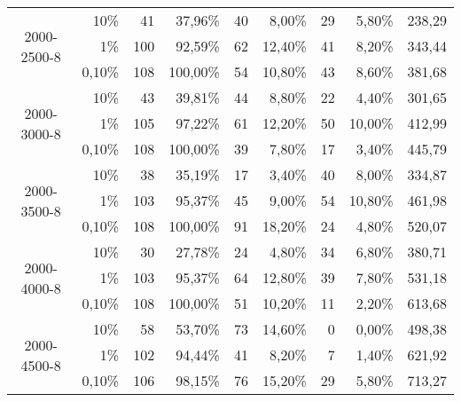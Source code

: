 \begin{sidewaystable}[htbp]
\begin{tabular}{rrrrrrrrr}
    \multicolumn{1}{c}{\multirow{3}[0]{*}{2000-2500-8}} & 10\%  & 41    & 37,96\% & 40    & 8,00\% & 29    & 5,80\% & 238,29 \\
    \multicolumn{1}{c}{} & 1\%   & 100   & 92,59\% & 62    & 12,40\% & 41    & 8,20\% & 343,44 \\
    \multicolumn{1}{c}{} & 0,10\% & 108   & 100,00\% & 54    & 10,80\% & 43    & 8,60\% & 381,68 \\
    \multicolumn{1}{c}{\multirow{3}[0]{*}{2000-3000-8}} & 10\%  & 43    & 39,81\% & 44    & 8,80\% & 22    & 4,40\% & 301,65 \\
    \multicolumn{1}{c}{} & 1\%   & 105   & 97,22\% & 61    & 12,20\% & 50    & 10,00\% & 412,99 \\
    \multicolumn{1}{c}{} & 0,10\% & 108   & 100,00\% & 39    & 7,80\% & 17    & 3,40\% & 445,79 \\
    \multicolumn{1}{c}{\multirow{3}[0]{*}{2000-3500-8}} & 10\%  & 38    & 35,19\% & 17    & 3,40\% & 40    & 8,00\% & 334,87 \\
    \multicolumn{1}{c}{} & 1\%   & 103   & 95,37\% & 45    & 9,00\% & 54    & 10,80\% & 461,98 \\
    \multicolumn{1}{c}{} & 0,10\% & 108   & 100,00\% & 91    & 18,20\% & 24    & 4,80\% & 520,07 \\
    \multicolumn{1}{c}{\multirow{3}[0]{*}{2000-4000-8}} & 10\%  & 30    & 27,78\% & 24    & 4,80\% & 34    & 6,80\% & 380,71 \\
    \multicolumn{1}{c}{} & 1\%   & 103   & 95,37\% & 64    & 12,80\% & 39    & 7,80\% & 531,18 \\
    \multicolumn{1}{c}{} & 0,10\% & 108   & 100,00\% & 51    & 10,20\% & 11    & 2,20\% & 613,68 \\
    \multicolumn{1}{c}{\multirow{3}[0]{*}{2000-4500-8}} & 10\%  & 58    & 53,70\% & 73    & 14,60\% & 0     & 0,00\% & 498,38 \\
    \multicolumn{1}{c}{} & 1\%   & 102   & 94,44\% & 41    & 8,20\% & 7     & 1,40\% & 621,92 \\
    \multicolumn{1}{c}{} & 0,10\% & 106   & 98,15\% & 76    & 15,20\% & 29    & 5,80\% & 713,27 \\
    \bottomrule
    \end{tabular}%
  \label{tab:PCRR}%
\end{sidewaystable}
